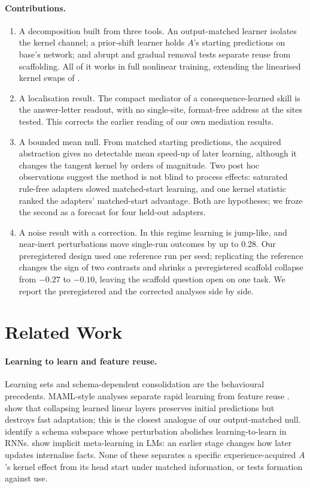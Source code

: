 \documentclass[11pt]{article}
\begin{document}
\paragraph{Contributions.}
\begin{enumerate}
\item A decomposition built from three tools. An output-matched learner isolates the kernel channel; a prior-shift learner holds $A$'s starting predictions on base's network; and abrupt and gradual removal tests separate reuse from scaffolding. All of it works in full nonlinear training, extending the linearised kernel swaps of \citet{ortizjimenez2021}.
\item A localisation result. The compact mediator of a consequence-learned skill is the answer-letter readout, with no single-site, format-free address at the sites tested. This corrects the earlier reading of our own mediation results.
\item A bounded mean null. From matched starting predictions, the acquired abstraction gives no detectable mean speed-up of later learning, although it changes the tangent kernel by orders of magnitude. Two post hoc observations suggest the method is not blind to process effects: saturated rule-free adapters slowed matched-start learning, and one kernel statistic ranked the adapters' matched-start advantage. Both are hypotheses; we froze the second as a forecast for four held-out adapters.
\item A noise result with a correction. In this regime learning is jump-like, and near-inert perturbations move single-run outcomes by up to 0.28. Our preregistered design used one reference run per seed; replicating the reference changes the sign of two contrasts and shrinks a preregistered scaffold collapse from $-0.27$ to $-0.10$, leaving the scaffold question open on one task. We report the preregistered and the corrected analyses side by side.
\end{enumerate}

\section{Related Work}

\paragraph{Learning to learn and feature reuse.} Learning sets \citep{harlow1949} and schema-dependent consolidation \citep{tse2007,maor2026} are the behavioural precedents. MAML-style analyses separate rapid learning from feature reuse \citep{raghu2020}. \citet{arnold2021} show that collapsing learned linear layers preserves initial predictions but destroys fast adaptation; this is the closest analogue of our output-matched null. \citet{goudar2023} identify a schema subspace whose perturbation abolishes learning-to-learn in RNNs. \citet{krasheninnikov2024} show implicit meta-learning in LMs: an earlier stage changes how later updates internalise facts. None of these separates a specific experience-acquired $A$'s kernel effect from its head start under matched information, or tests formation against use.
\end{document}
